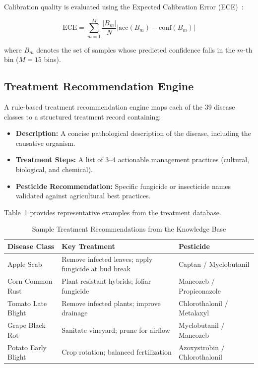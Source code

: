 \documentclass[conference]{IEEEtran}
\begin{document}
Calibration quality is evaluated using the Expected Calibration Error (ECE)~\cite{guo2017calibration}:

\begin{equation}
    \text{ECE} = \sum_{m=1}^{M} \frac{|B_m|}{N} \left| \mathrm{acc}(B_m) - \mathrm{conf}(B_m) \right|
\end{equation}

\noindent where $B_m$ denotes the set of samples whose predicted confidence falls in the $m$-th bin ($M = 15$ bins).

\subsection{Treatment Recommendation Engine}

A rule-based treatment recommendation engine maps each of the 39 disease classes to a structured treatment record containing:
\begin{itemize}
    \item \textbf{Description:} A concise pathological description of the disease, including the causative organism.
    \item \textbf{Treatment Steps:} A list of 3--4 actionable management practices (cultural, biological, and chemical).
    \item \textbf{Pesticide Recommendation:} Specific fungicide or insecticide names validated against agricultural best practices.
\end{itemize}

Table~\ref{tab:treatment_sample} provides representative examples from the treatment database.

\begin{table}[htbp]
\caption{Sample Treatment Recommendations from the Knowledge Base}
\label{tab:treatment_sample}
\centering
\renewcommand{\arraystretch}{1.15}
\begin{tabular}{@{}p{2.4cm}p{2.8cm}p{2.2cm}@{}}
\toprule
\textbf{Disease Class} & \textbf{Key Treatment} & \textbf{Pesticide} \\
\midrule
Apple Scab & Remove infected leaves; apply fungicide at bud break & Captan / Myclobutanil \\
\addlinespace
Corn Common Rust & Plant resistant hybrids; foliar fungicide & Mancozeb / Propiconazole \\
\addlinespace
Tomato Late Blight & Remove infected plants; improve drainage & Chlorothalonil / Metalaxyl \\
\addlinespace
Grape Black Rot & Sanitate vineyard; prune for airflow & Myclobutanil / Mancozeb \\
\addlinespace
Potato Early Blight & Crop rotation; balanced fertilization & Azoxystrobin / Chlorothalonil \\
\bottomrule
\end{tabular}
\end{table}
\end{document}
